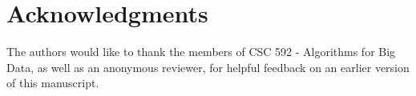 \section{Acknowledgments}
\label{sec:acknowledgements}

The authors would like to thank the members of CSC 592 - Algorithms for Big Data, as well as an anonymous reviewer, for helpful feedback on an earlier version of this manuscript.

